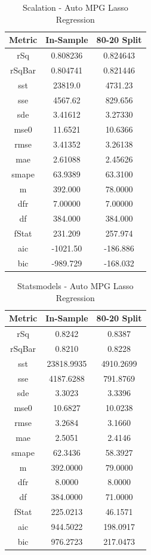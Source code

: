 \documentclass{article}
\begin{document}
\begin{table}[H]
\centering
\caption{Scalation - Auto MPG Lasso Regression}
\label{tab:Scalation - Auto MPG Lasso Regression}
\begin{tabular}{|c|c|c|} \hline 
Metric & In-Sample & 80-20 Split \\ \hline \hline 
rSq &0.808236 & 0.824643 \\ \hline 
rSqBar &0.804741 &      0.821446 \\ \hline 
sst &23819.0 &  4731.23 \\ \hline 
sse &4567.62 &  829.656 \\ \hline 
sde &3.41612 &  3.27330 \\ \hline 
mse0 &11.6521 & 10.6366 \\ \hline 
rmse &3.41352 & 3.26138 \\ \hline 
mae &2.61088 &  2.45626 \\ \hline 
smape &63.9389 &        63.3100 \\ \hline 
m &392.000 &    78.0000 \\ \hline 
dfr &7.00000 &  7.00000 \\ \hline 
df &384.000 &   384.000 \\ \hline 
fStat &231.209 &        257.974 \\ \hline 
aic &-1021.50 & -186.886 \\ \hline 
bic &-989.729 & -168.032 \\ \hline 
\end{tabular}
\end{table}

\begin{table}[H]
\centering
\caption{Statsmodels - Auto MPG Lasso Regression}
\label{tab:Statsmodels - Auto MPG Lasso Regression}
\begin{tabular}{|c|c|c|}\hline
Metric & In-Sample & 80-20 Split \\ \hline \hline
rSq & 0.8242 & 0.8387 \\ \hline
rSqBar & 0.8210 & 0.8228 \\ \hline
sst & 23818.9935 & 4910.2699 \\ \hline
sse & 4187.6288 & 791.8769 \\ \hline
sde & 3.3023 & 3.3396 \\ \hline
mse0 & 10.6827 & 10.0238 \\ \hline
rmse & 3.2684 & 3.1660 \\ \hline
mae & 2.5051 & 2.4146 \\ \hline
smape & 62.3436 & 58.3927 \\ \hline
m & 392.0000 & 79.0000 \\ \hline
dfr & 8.0000 & 8.0000 \\ \hline
df & 384.0000 & 71.0000 \\ \hline
fStat & 225.0213 & 46.1571 \\ \hline
aic & 944.5022 & 198.0917 \\ \hline
bic & 976.2723 & 217.0473 \\ \hline
\end{tabular}
\end{table}
\end{document}
